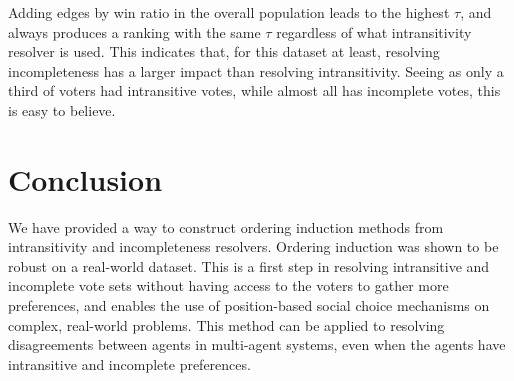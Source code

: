 \documentclass[letterpaper]{article} %
\begin{document}
\renewcommand{\arraystretch}{1.2}
\begin{table}
\end{table}

Adding edges by win ratio in the overall population leads to the highest $\tau$, and always produces a ranking with the same $\tau$ regardless of what intransitivity resolver is used. This indicates that, for this dataset at least, resolving incompleteness has a larger impact than resolving intransitivity. Seeing as only a third of voters had intransitive votes, while almost all has incomplete votes, this is easy to believe.

\section{Conclusion}
We have provided a way to construct ordering induction methods from intransitivity and incompleteness resolvers. Ordering induction was shown to be robust on a real-world dataset. This is a first step in resolving intransitive and incomplete vote sets without having access to the voters to gather more preferences, and enables the use of position-based social choice mechanisms on complex, real-world problems. This method can be applied to resolving disagreements between agents in multi-agent systems, even when the agents have intransitive and incomplete preferences.



\end{document}
